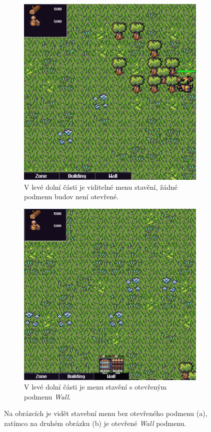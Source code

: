 \begin{figure}[H]
	\centering
	\begin{subfigure}{0.475\textwidth}
		\centering
		\includegraphics[scale=0.5]{obrazky-figures/buildingMenuInactive.png}
		\caption{V levé dolní části je viditelné menu stavění, žádné podmenu budov není otevřené.}
	\end{subfigure}
	\begin{subfigure}{0.475\textwidth}
		\centering
		\includegraphics[scale=0.5]{obrazky-figures/buildingMenuOpened.png}
		\caption{V levé dolní části je menu stavění s otevřeným podmenu \emph{Wall}.}
	\end{subfigure}
	\caption{Na obrázcích je vidět stavební menu bez otevřeného podmenu (a), zatímco na druhém obrázku (b) je otevřené \emph{Wall} podmenu.}
	\label{BuildingMenu}
\end{figure}


